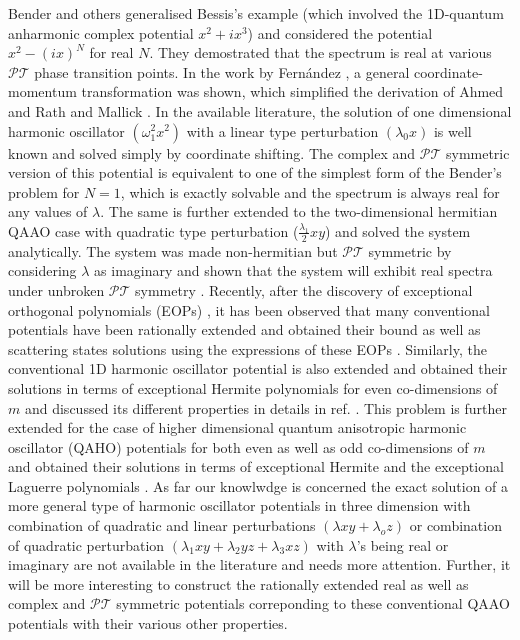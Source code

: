 \documentclass[a4paper, 12pt]{article}
\begin{document}
Bender and others \cite{bender1998real} generalised Bessis's example \cite{bessis} (which involved the 1D-quantum anharmonic complex potential $x^2+ix^3$) and considered the potential $x^2-(ix)^N$ for real $N$. They demostrated that the spectrum is real at various $\mathcal{PT}$ phase transition points. In the work by Fernández \cite{fernandez2016non}, a general coordinate-momentum transformation was shown, which simplified the derivation of Ahmed \cite{ahmed2002pseudo} and Rath and Mallick \cite{rath2015zero}. In the available literature, the solution of one dimensional harmonic oscillator $(\omega_1^2 x^2)$ with a linear type perturbation $(\lambda_0 x)$ is well known \cite{singh2019pt} and solved simply by coordinate shifting. The complex and  $\mathcal{PT}$ symmetric version of this potential is equivalent to one of the simplest form of the Bender's problem for $N=1$, which is exactly solvable  and the spectrum is always real for any values of $\lambda$.  The same is further extended to the two-dimensional hermitian QAAO case with quadratic type perturbation ($\frac{\lambda_1}{2} xy$) and solved the system analytically. The system was made non-hermitian but $\mathcal{PT}$ symmetric by considering $\lambda$ as imaginary and shown that the system will exhibit real spectra under unbroken $\mathcal{PT}$ symmetry \cite{mandal2013pt}. Recently, after the discovery of exceptional orthogonal polynomials (EOPs) \cite{gomez2010extension, gomez2009extended, quesne2008exceptional}, it has been observed that many conventional potentials have been rationally extended and obtained their bound as well as scattering states solutions using the expressions of these EOPs \cite{Kumar:2024tsz}. Similarly, the conventional 1D harmonic oscillator potential is also extended and obtained their solutions in terms of exceptional Hermite polynomials for even co-dimensions of $m$ \cite{mandal2013pt} and discussed its different properties in details in ref. \cite{kumar2023rationally}. This problem is further extended for the case of higher dimensional quantum anisotropic harmonic oscillator (QAHO) potentials for both even as well as odd co-dimensions of $m$ and obtained their solutions in terms of exceptional Hermite and the exceptional Laguerre polynomials \cite{gomez2013rational, bonneux2018exceptional}. As far  our knowlwdge is concerned the exact solution of a more general type of harmonic oscillator potentials in three dimension with combination of quadratic and linear perturbations $(\lambda xy + \lambda_o z )$ or combination of quadratic perturbation $(\lambda_1 xy + \lambda_2 yz + \lambda_3 xz)$ with $\lambda$'s being real or imaginary are not available in the literature and needs more attention. Further, it will be more interesting to construct the rationally extended real as well as complex and $\mathcal{PT}$ symmetric potentials correponding to these conventional QAAO potentials with their various other properties. 
\end{document}
